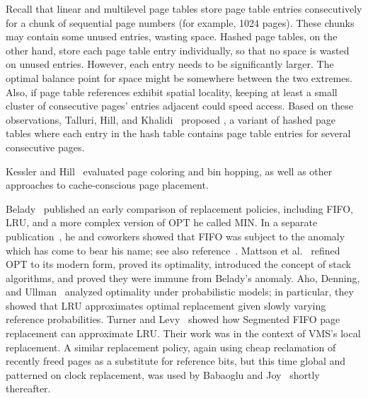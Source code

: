 Recall that linear and multilevel page tables store page table
entries consecutively for a chunk of sequential page numbers (for
example, 1024 pages).  These chunks may contain some unused
entries, wasting space.  Hashed page tables, on the other hand, store
each page table entry individually, so that no space is wasted on unused
entries.  However, each entry needs to be significantly larger.  The
optimal balance point for space might be somewhere between the two
extremes.  Also, if page table references exhibit spatial locality,
keeping at least a small cluster of consecutive pages' entries
adjacent could speed access.  Based on these observations,
Talluri,
Hill, and Khalidi~\cite{max1060} proposed , a
variant of hashed page tables where each entry in the hash table
contains page table entries for several consecutive pages.

Kessler and Hill~\cite{max732} evaluated page coloring and bin
hopping, as well as other approaches to cache-conscious page
placement.

Belady~\cite{max1072} published an early comparison of replacement
policies, including FIFO, LRU, and a more complex version of OPT he
called MIN.  In a separate publication~\cite{max1029}, he and
coworkers showed that
FIFO was subject to the anomaly which has come to bear his name; see
also reference~\cite{max1030}.  Mattson et al.~\cite{max1073} refined
OPT to its modern form, proved its optimality, introduced the concept
of stack algorithms, and proved they were immune from Belady's
anomaly.  Aho, Denning,
and Ullman~\cite{max1031} analyzed optimality
under probabilistic models; in particular, they showed that LRU
approximates optimal replacement given slowly varying reference
probabilities.  Turner and Levy~\cite{max1075} showed how Segmented
FIFO page replacement can approximate LRU.  Their work was in the context
of VMS's local replacement.  A similar replacement policy, again using
cheap reclamation of recently freed pages as a substitute for
reference bits, but this time global and patterned on clock replacement, was used
by Babaoglu and
Joy~\cite{max1074} shortly thereafter.
